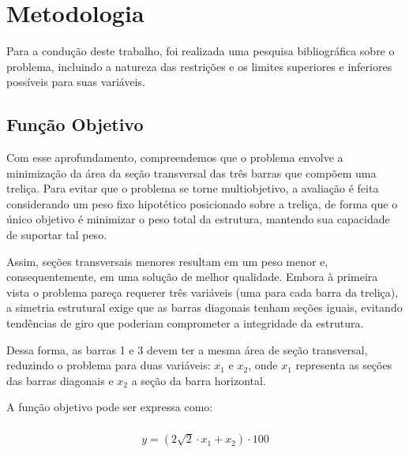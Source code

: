 \section{Metodologia}%
\label{sec:metodologia}

Para a condução deste trabalho, foi realizada uma pesquisa bibliográfica sobre o problema, incluindo a natureza das restrições e os limites superiores e inferiores possíveis para suas variáveis.

\subsection{Função Objetivo}

Com esse aprofundamento, compreendemos que o problema envolve a minimização da área da seção transversal das três barras que compõem uma treliça. Para evitar que o problema se torne multiobjetivo, a avaliação é feita considerando um peso fixo hipotético posicionado sobre a treliça, de forma que o único objetivo é minimizar o peso total da estrutura, mantendo sua capacidade de suportar tal peso.

Assim, seções transversais menores resultam em um peso menor e, consequentemente, em uma solução de melhor qualidade. Embora à primeira vista o problema pareça requerer três variáveis (uma para cada barra da treliça), a simetria estrutural exige que as barras diagonais tenham seções iguais, evitando tendências de giro que poderiam comprometer a integridade da estrutura.

Dessa forma, as barras 1 e 3 devem ter a mesma área de seção transversal, reduzindo o problema para duas variáveis: \(x_1\) e \(x_2\), onde \(x_1\) representa as seções das barras diagonais e \(x_2\) a seção da barra horizontal.



A função objetivo pode ser expressa como:

\begin{gather}
    \begin{align}
        \begin{split}
            y = \left( 2 \sqrt{2} \cdot x_1 + x_2 \right) \cdot 100
        \end{split}
    \end{align}
\end{gather}


